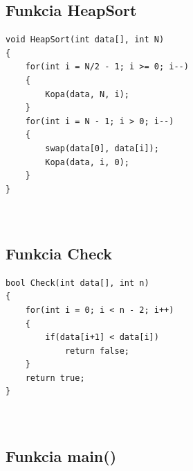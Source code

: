 \documentclass[12pt]{article}
\begin{document}
    \subsection*{Funkcia HeapSort}

    \begin{lstlisting}
void HeapSort(int data[], int N)
{
    for(int i = N/2 - 1; i >= 0; i--)
    {
        Kopa(data, N, i);
    }
    for(int i = N - 1; i > 0; i--)
    {
        swap(data[0], data[i]);
        Kopa(data, i, 0);
    }
}
    
    
    \end{lstlisting}
    
    \subsection*{Funkcia Check}

    \begin{lstlisting}
bool Check(int data[], int n)
{
    for(int i = 0; i < n - 2; i++)
    {
        if(data[i+1] < data[i])
            return false;
    }
    return true;
}
    
    
    \end{lstlisting}

    
    \subsection*{Funkcia main()}
\end{document}
